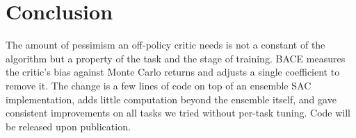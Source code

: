 \documentclass[10pt,twocolumn,letterpaper]{article}
\newcommand{\method}{\textsc{BACE}}
\begin{document}
\section{Conclusion}
\label{sec:conclusion}

The amount of pessimism an off-policy critic needs is not a constant of the algorithm but a property of the task and the stage of training. \method{} measures the critic's bias against Monte Carlo returns and adjusts a single coefficient to remove it. The change is a few lines of code on top of an ensemble SAC implementation, adds little computation beyond the ensemble itself, and gave consistent improvements on all tasks we tried without per-task tuning. Code will be released upon publication.



\end{document}

